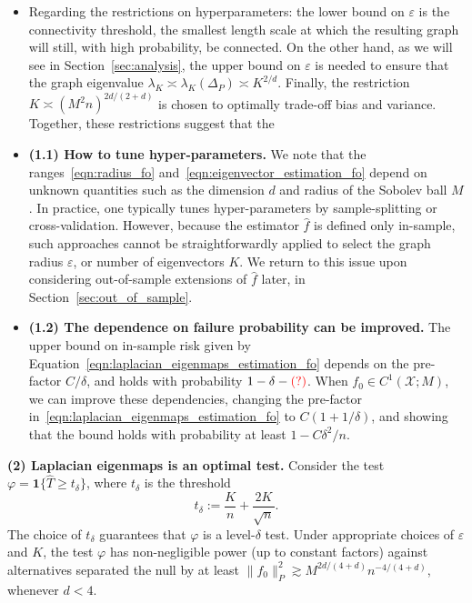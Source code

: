 \documentclass{article}
\newcommand{\1}{\mathbf{1}}
\newcommand{\mc}[1]{\mathcal{#1}}
\newcommand{\wh}[1]{\widehat{#1}}
\theoremstyle{alden}
\theoremstyle{aldenthm}
\theoremstyle{definition}
\theoremstyle{remark}
\begin{document}
\begin{itemize}
	\item Regarding the restrictions on hyperparameters: the lower bound on $\varepsilon$ is the connectivity threshold, the smallest length scale at which the resulting graph will still, with high probability, be connected. On the other hand, as we will see in Section~\ref{sec:analysis}, the upper bound on $\varepsilon$ is needed to ensure that the graph eigenvalue $\lambda_K \asymp \lambda_K(\Delta_P) \asymp K^{2/d}$. Finally, the restriction $K \asymp (M^2n)^{2d/(2 + d)}$ is chosen  to optimally trade-off bias and variance. Together, these restrictions suggest that the 
	\item \textbf{(1.1) How to tune hyper-parameters.} We note that the ranges~\eqref{eqn:radius_fo} and~\eqref{eqn:eigenvector_estimation_fo} depend on unknown quantities such as the dimension $d$ and radius of the Sobolev ball $M$. In practice, one typically tunes hyper-parameters by sample-splitting or cross-validation. However, because the estimator $\wh{f}$ is defined only in-sample, such approaches cannot be straightforwardly applied to select the graph radius $\varepsilon$, or number of eigenvectors $K$. We return to this issue upon considering out-of-sample extensions of $\wh{f}$ later, in Section~\ref{sec:out_of_sample}.
	\item \textbf{(1.2) The dependence on failure probability can be improved.} The upper bound on in-sample risk given by Equation~\eqref{eqn:laplacian_eigenmaps_estimation_fo} depends on the pre-factor $C/\delta$, and holds with probability $1 - \delta - \textcolor{red}{(?)}$. When $f_0 \in C^1(\mc{X};M)$, we can improve these dependencies, changing the pre-factor in~\eqref{eqn:laplacian_eigenmaps_estimation_fo} to $C(1 + 1/\delta)$, and showing that the bound holds with probability at least $1 - C\delta^2/n$. 
\end{itemize}

\textbf{(2) Laplacian eigenmaps is an optimal test.} Consider the test $\varphi = \1\{\wh{T} \geq t_{\delta}\}$, where $t_{\delta}$ is the threshold
\begin{equation*}
t_{\delta} := \frac{K}{n} + \frac{2K}{\sqrt{n}}.
\end{equation*}
The choice of $t_{\delta}$ guarantees that $\varphi$ is a level-$\delta$ test. Under appropriate choices of $\varepsilon$ and $K$, the test $\varphi$ has non-negligible power (up to constant factors) against alternatives separated the null by at least $\|f_0\|_{P}^2 \gtrsim M^{2d/(4 + d)}n^{-4/(4 + d)}$, whenever $d < 4$. 
\end{document}
